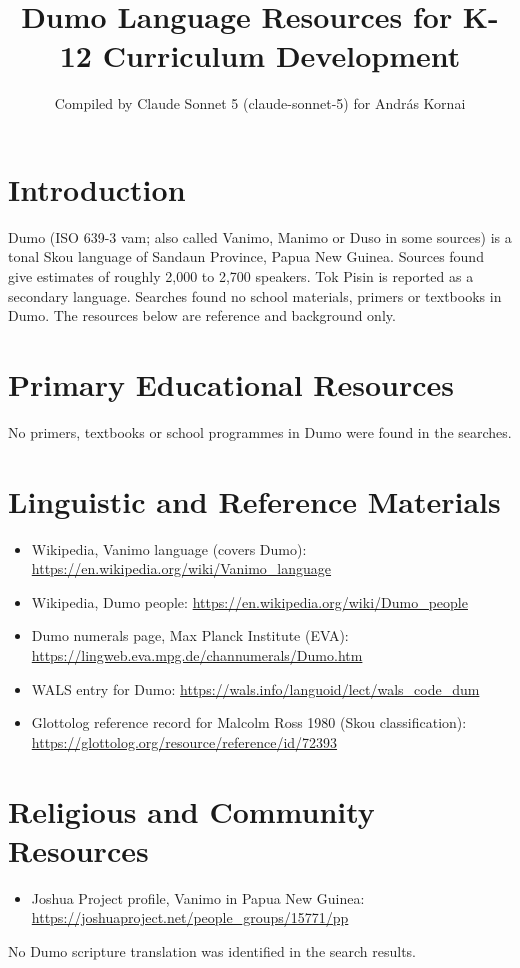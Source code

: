 \documentclass[12pt]{article}
\title{Dumo Language Resources for K-12 Curriculum Development}
\author{Compiled by Claude Sonnet 5 (claude-sonnet-5) for Andr\'as Kornai}
\date{}
\begin{document}
\maketitle

\section{Introduction}
Dumo (ISO 639-3 vam; also called Vanimo, Manimo or Duso in some sources) is a tonal Skou language of Sandaun Province, Papua New Guinea. Sources found give estimates of roughly 2,000 to 2,700 speakers. Tok Pisin is reported as a secondary language. Searches found no school materials, primers or textbooks in Dumo. The resources below are reference and background only.

\section{Primary Educational Resources}
No primers, textbooks or school programmes in Dumo were found in the searches.

\section{Linguistic and Reference Materials}
\begin{itemize}
\item Wikipedia, Vanimo language (covers Dumo): \url{https://en.wikipedia.org/wiki/Vanimo_language}
\item Wikipedia, Dumo people: \url{https://en.wikipedia.org/wiki/Dumo_people}
\item Dumo numerals page, Max Planck Institute (EVA): \url{https://lingweb.eva.mpg.de/channumerals/Dumo.htm}
\item WALS entry for Dumo: \url{https://wals.info/languoid/lect/wals_code_dum}
\item Glottolog reference record for Malcolm Ross 1980 (Skou classification): \url{https://glottolog.org/resource/reference/id/72393}
\end{itemize}

\section{Religious and Community Resources}
\begin{itemize}
\item Joshua Project profile, Vanimo in Papua New Guinea: \url{https://joshuaproject.net/people_groups/15771/pp}
\end{itemize}
No Dumo scripture translation was identified in the search results.
\end{document}

